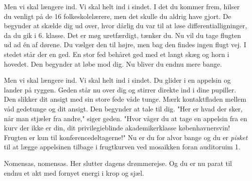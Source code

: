\documentclass[a4paper,11pt]{article}
\begin{document}
\begin{sketch}
 Men vi skal længere ind. Vi skal helt ind i sindet. I det du kommer frem, hilser du venligt på de 16 folkeskolelærere, men det skulle du aldrig have gjort. De begynder at skælde dig ud over, hvor dårlig du var til at løse differentialligninger, da du gik i 6. klasse. Det er møg uretfærdigt, tænker du. Nu vil du tage flugten ud ad én af dørene. Du vælger den til højre, men bag den findes ingen flugt vej. I stedet står der en ged. En stor fed behåret ged med et langt skæg og horn i hovedet. Den begynder at løbe mod dig. Nu bliver du endnu mere bange.

 Men vi skal længere ind. Vi skal helt ind i sindet. Du glider i en appelsin og lander på ryggen. Geden står nu over dig og stirrer direkte ind i dine pupiller. Den slikker dit ansigt med sin store fede våde tunge. Mærk kontaktfladen mellem våd gedetunge og dit ansigt. Den begynder at tale til dig. "Her er hvad der sker, når man stjæler fra andre," siger geden. "Hvor våger du at tage en appelsin fra en kurv der ikke er din, dit privilegieblinde akademikerklasse københavnersvin! Frugten er kun til konferencedeltagerne!" Nu er du for alvor bange og du er \textit{pisket} til at lægge appelsinen tilbage i frugtkurven ved mosaikken foran auditoruim 1.

 Nomensas, nomensas. Her slutter dagens drømmerejse. Og du er nu parat til endnu et akt med fornyet energi i krop og sjæl.


\end{sketch}
\end{document}
